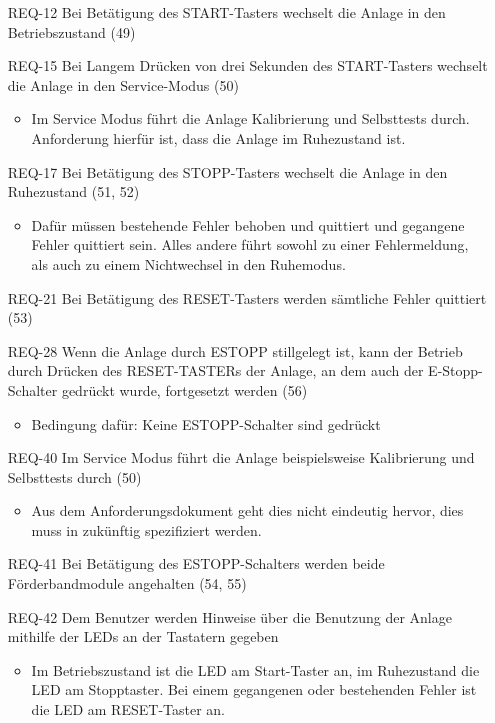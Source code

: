 \begin{itemize}
    \item[REQ-12] Bei Betätigung des START-Tasters wechselt die Anlage in den Betriebszustand (49)
    \item[REQ-15] Bei Langem Drücken von drei Sekunden des START-Tasters wechselt die Anlage in den Service-Modus (50)
    \begin{itemize}
        \item Im Service Modus führt die Anlage Kalibrierung und Selbsttests durch. Anforderung hierfür ist, dass die Anlage im Ruhezustand ist.
    \end{itemize}
    \item[REQ-17] Bei Betätigung des STOPP-Tasters wechselt die Anlage in den Ruhezustand (51, 52)
    \begin{itemize}
        \item Dafür müssen bestehende Fehler behoben und quittiert und gegangene Fehler quittiert sein. Alles andere führt sowohl zu einer Fehlermeldung, als auch zu einem Nichtwechsel in den Ruhemodus.
    \end{itemize}
    \item[REQ-21] Bei Betätigung des RESET-Tasters werden sämtliche Fehler quittiert (53)
    \item[REQ-28] Wenn die Anlage durch ESTOPP stillgelegt ist, kann der Betrieb durch Drücken des RESET-TASTERs der Anlage, an dem auch der E-Stopp-Schalter gedrückt wurde, fortgesetzt werden (56)
    \begin{itemize}
        \item Bedingung dafür: Keine ESTOPP-Schalter sind gedrückt
    \end{itemize}
    \item[REQ-40] Im Service Modus führt die Anlage beispielsweise Kalibrierung und Selbsttests durch (50)
    \begin{itemize}
        \item Aus dem Anforderungsdokument geht dies nicht eindeutig hervor, dies muss in zukünftig spezifiziert werden.
    \end{itemize}
    \item[REQ-41] Bei Betätigung des ESTOPP-Schalters werden beide Förderbandmodule angehalten (54, 55)
    \item[REQ-42] Dem Benutzer werden Hinweise über die Benutzung der Anlage mithilfe der LEDs an der Tastatern gegeben
    \begin{itemize}
        \item Im Betriebszustand ist die LED am Start-Taster an, im Ruhezustand die LED am Stopptaster. Bei einem gegangenen oder bestehenden Fehler ist die LED am RESET-Taster an.
    \end{itemize}
\end{itemize}

